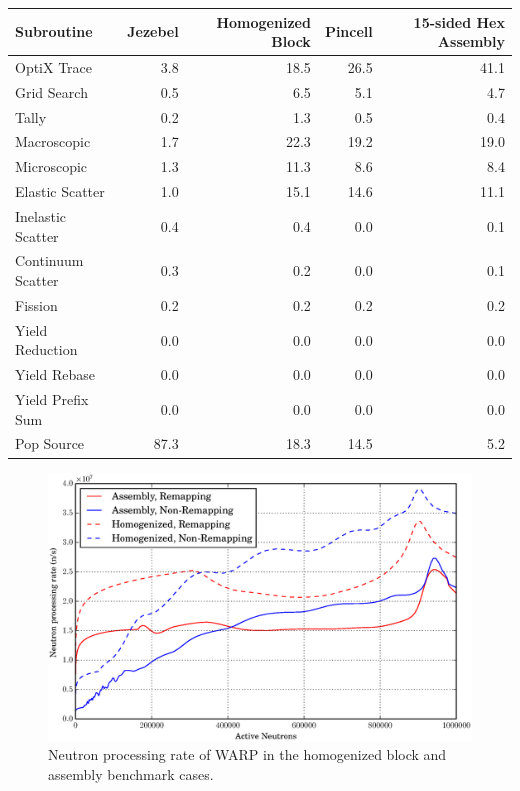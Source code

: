 \begin{table}[h]
\begin{tabular}{| l | r  | r | r | r |}
 \hline
Subroutine         & Jezebel & Homogenized Block & Pincell & 15-sided Hex Assembly  \\
\hline \hline
 OptiX Trace       & 3.8       &    18.5                        &   26.5    &      41.1    \\ \hline
 Grid Search       & 0.5       &    6.5                         &   5.1       &      4.7       \\ \hline
 Tally                   & 0.2       &    1.3                         &   0.5       &      0.4       \\ \hline
 Macroscopic      & 1.7       &   22.3                        &   19.2      &     19.0     \\ \hline
 Microscopic       & 1.3       &    11.3                        &  8.6        &      8.4       \\ \hline
 Elastic Scatter   & 1.0       &     15.1                       &   14.6    &      11.1    \\ \hline
 Inelastic Scatter & 0.4       &     0.4                         &   0.0      &       0.1   \\ \hline
 Continuum Scatter & 0.3   &     0.2                         &   0.0      &       0.1   \\ \hline
 Fission               & 0.2       &      0.2                        &   0.2      &       0.2     \\ \hline
 Yield Reduction  & 0.0       &      0.0                        &   0.0     &       0.0    \\ \hline
 Yield Rebase     & 0.0        &     0.0                         &   0.0     &       0.0   \\ \hline
 Yield Prefix Sum &  0.0       &    0.0                         &   0.0     &       0.0   \\ \hline
 Pop Source         &  87.3     &    18.3                       &   14.5   &      5.2    \\ 
\hline
\end{tabular}
\end{table}

\begin{figure}[h!]
\centering
\includegraphics[width=\textwidth]{graphics/finalresults/process_rate.eps}
\caption{Neutron processing rate of WARP in the homogenized block and assembly benchmark cases. \label{process_rate} }
\end{figure}

